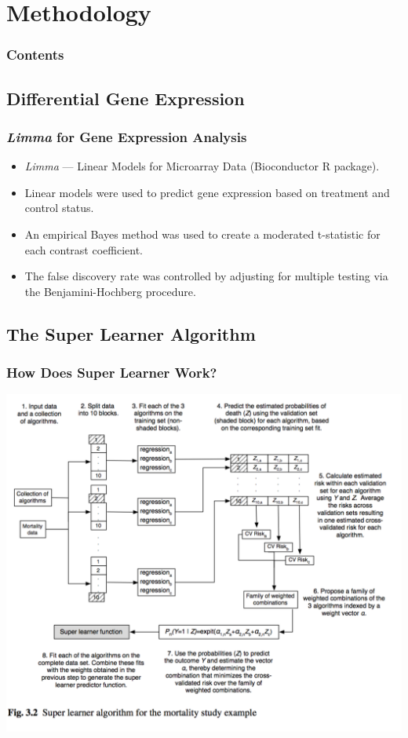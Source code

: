 \documentclass{beamer}
\begin{document}
\section{Methodology}

\begin{frame}
        \frametitle{Contents}
        \tableofcontents[currentsection,currentsubsection,hideothersubsections,sectionstyle=show/shaded]
\end{frame}

\subsection{Differential Gene Expression}

\begin{frame}[fragile]
	\frametitle{\textit{Limma} for Gene Expression Analysis}
 		\begin{itemize}
			\item \textit{Limma} --- Linear Models for Microarray Data (Bioconductor R package).
			\item Linear models were used to predict gene expression based on treatment and control status.
			\item An empirical Bayes method was used to create a moderated t-statistic for each contrast coefficient.
			\item The false discovery rate was controlled by adjusting for multiple testing via the Benjamini-Hochberg procedure.
		\end{itemize}
\end{frame}

\subsection{The Super Learner Algorithm}

\begin{frame}
	\frametitle{How Does Super Learner Work?}
		\begin{center}
    			\includegraphics[scale=0.45]{../paper/figs/SuperLearn2.png}
		\end{center}
\end{frame}
\end{document}
